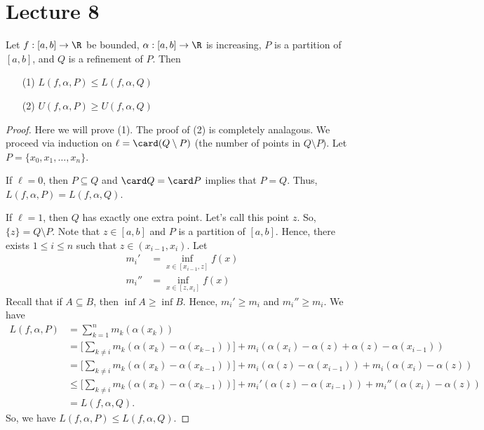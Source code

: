 \section{Lecture 8}

\begin{theorem}[Rudin 6.4]
    Let \( f: [a,b] \to \R  \) be bounded, \( \alpha : [a,b] \to \R  \) is increasing, \( P  \) is a partition of \( [a,b] \), and \( Q  \) is a refinement of \( P  \). Then
    \begin{enumerate}
        \item[(1)] \( L(f,\alpha,P) \leq L(f,\alpha, Q) \)
        \item[(2)] \( U(f,\alpha, P) \geq U(f,\alpha, Q ) \)
    \end{enumerate}
\end{theorem}
\begin{proof}
Here we will prove (1). The proof of (2) is completely analagous. We proceed via induction on \( \ell = \card (Q \setminus  P )  \) (the number of points in \( Q \setminus  P  \)). Let \( P = \{  {x}_{0}, {x}_{1}, \dots, {x}_{n} \}  \). 

If \( \ell = 0  \), then \( P \subseteq  Q   \) and \( \card Q = \card P  \) implies that \( P = Q  \). Thus, \( L(f,\alpha, P) = L(f,\alpha, Q ) \).

If \( \ell = 1  \), then \( Q  \) has exactly one extra point. Let's call this point \( z  \). So, \( \{ z  \}  = Q \setminus  P  \). Note that \( z \in [a,b] \) and \( P  \) is a partition of \( [a,b] \). Hence, there exists \( 1 \leq i \leq n  \) such that \( z \in ({x}_{i-1}, {x}_{i}) \). Let 
\begin{align*}
    {m}_{i}' &= \inf_{x \in [{x}_{i-1}, z]} f(x)  \\
    {m}_{i}'' &= \inf_{x \in [z,{x}_{i}]} f(x)
\end{align*}
Recall that if \( A \subseteq  B  \), then \( \inf A \geq \inf B  \). Hence, \( {m}_{i}' \geq {m}_{i} \) and \( {m}_{i}'' \geq {m}_{i} \).
We have 
\begin{align*}
    L(f,\alpha, P ) &= \sum_{ k=1  }^{ n } {m}_{k } (\alpha({x}_{k})) \\ 
                    &= \Big[ \sum_{ k \neq i  }^{  } {m}_{k } (\alpha({x}_{k}) - \alpha({x}_{k-1})) \Big] + {m}_{i} (\alpha({x}_{i}) - \alpha(z) + \alpha(z) - \alpha({x}_{i-1})) \\
                    &= \Big[ \sum_{ k \neq i  }^{  } {m}_{k } (\alpha({x}_{k}) - \alpha({x}_{k-1}))  \Big] +  {m}_{i}(\alpha(z) - \alpha({x}_{i-1})) + {m}_{i} (\alpha({x}_{i}) - \alpha(z) ) \\
                    &\leq \Big[\sum_{ k \neq i  }^{  } {m}_{k } (\alpha({x}_{k}) - \alpha({x}_{k-1})) \Big] + {m}_{i}' (\alpha(z) - \alpha({x}_{i-1})) + {m}_{i}''(\alpha({x}_{i}) - \alpha(z)) \\
                    &= L(f,\alpha, Q ).
\end{align*} 
So, we have \( L(f,\alpha,P) \leq L(f,\alpha,Q ) \).


\end{proof}
